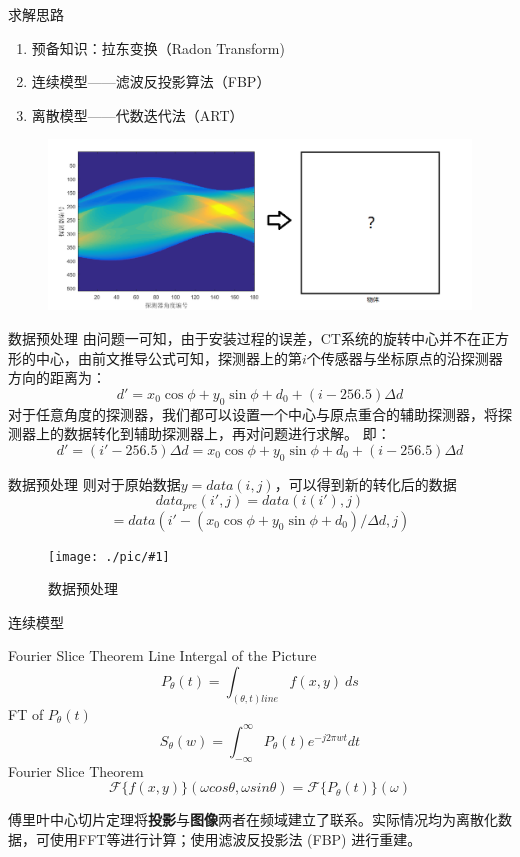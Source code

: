 \documentclass{beamer} %
\newcommand{\midpic}[2]{  \begin{figure}[H]
\centering
\texttt{[image: ./pic/\#1]}\\
\caption{#2}
\end{figure}}
\begin{document}
\begin{frame}{求解思路}
	\begin{enumerate}
		\item 预备知识：拉东变换（Radon Transform)
		\item 连续模型——滤波反投影算法（FBP）
		\item 离散模型——代数迭代法（ART）
	\end{enumerate}
	\begin{figure}[H]
		\centering
		\includegraphics[width=1\textwidth]{./pic/pro3.png}\\
		\end{figure}
\end{frame}

\begin{frame}{数据预处理}
	由问题一可知，由于安装过程的误差，CT系统的旋转中心并不在正方形的中心，由前文推导公式可知，探测器上的第\(i\)个传感器与坐标原点的沿探测器方向的距离为：
	\[d' = x_0\cos\phi + y_0\sin\phi + d_0 +  (i - 256.5)\Delta d\]
	对于任意角度的探测器，我们都可以设置一个中心与原点重合的辅助探测器，将探测器上的数据转化到辅助探测器上，再对问题进行求解。
	即：
	\[d' = (i' - 256.5)\Delta d = x_0\cos\phi + y_0\sin\phi + d_0 +  (i - 256.5)\Delta d\]
\end{frame}

\begin{frame}{数据预处理}
	则对于原始数据\( y = data(i,j)\)，可以得到新的转化后的数据
	\[data_{pre}(i',j) = data(i(i'),j)\]
	\[ = data(i' - (x_0\cos\phi + y_0\sin\phi + d_0)/\Delta d,j)\]
	\midpic{datapre3.png}{数据预处理}
\end{frame}

\begin{frame}{连续模型}
	\begin{theorem}{Fourier Slice Theorem}
		Line Intergal of the Picture
		\[ P_\theta (t) = \int_{(\theta, t) line}f(x, y)\ ds \]
		FT of $P_\theta (t)$
		\[S_\theta (w) = \int_{-\infty}^{\infty}P_\theta (t) e^{-j2\pi wt}dt \]
		Fourier Slice Theorem  
		\[\mathcal{F}\{f(x,y)\}(\omega cos\theta,\omega sin\theta)=\mathcal{F}\{P_\theta(t)\}(\omega)\]
	\end{theorem}
	  
	\footnotesize 傅里叶中心切片定理将\textbf{投影}与\textbf{图像}两者在频域建立了联系。实际情况均为离散化数据，可使用FFT等进行计算；使用滤波反投影法 (FBP) 进行重建。  
\end{frame}
  
\end{document}
